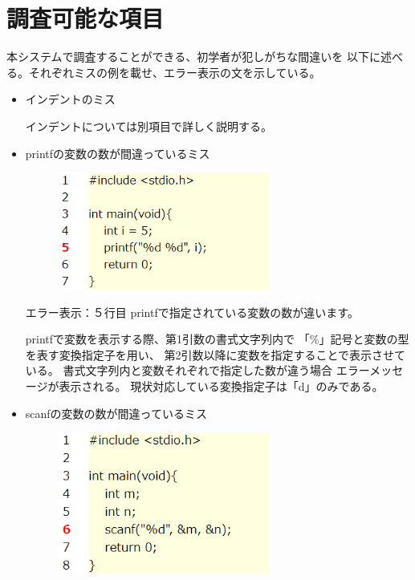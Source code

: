 \documentclass{csspaper}
\begin{document}
      \section{調査可能な項目}
      本システムで調査することができる、初学者が犯しがちな間違いを
      以下に述べる。それぞれミスの例を載せ、エラー表示の文を示している。
      \begin{itemize}
         \item インデントのミス
         
         インデントについては別項目で詳しく説明する。

         \item printfの変数の数が間違っているミス
         
         \begin{figure}[h]
            \centering
            \includegraphics[width=7cm]{sample1.png}
         \end{figure}

         エラー表示：５行目 printfで指定されている変数の数が違います。

         printfで変数を表示する際、第1引数の書式文字列内で
         「\%」記号と変数の型を表す変換指定子を用い、
         第2引数以降に変数を指定することで表示させている。
         書式文字列内と変数それぞれで指定した数が違う場合
         エラーメッセージが表示される。
         現状対応している変換指定子は「d」のみである。

         \item scanfの変数の数が間違っているミス
         
         \begin{figure}[htbp]
            \centering
            \includegraphics[width=7cm]{sample2.png}
         \end{figure}


\end{itemize}
\end{document}
